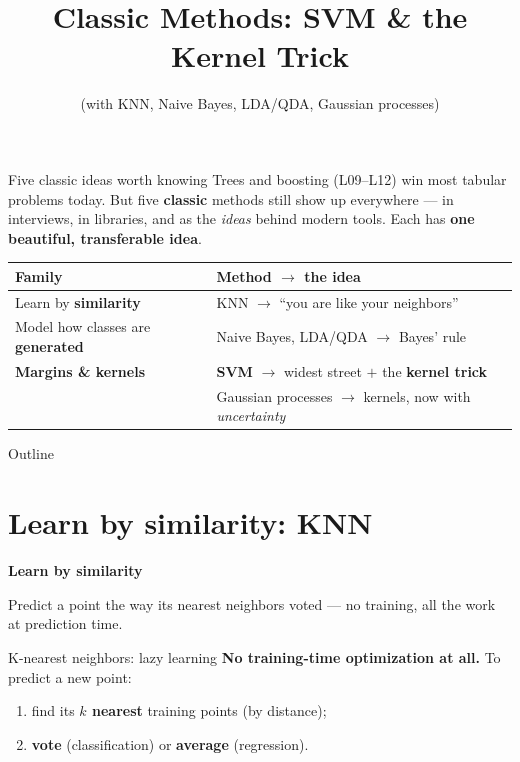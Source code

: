 \documentclass[aspectratio=169]{beamer}
\title{Classic Methods: SVM \& the Kernel Trick}
\subtitle{(with KNN, Naive Bayes, LDA/QDA, Gaussian processes)}
\date{}
\newcommand{\sectiontransition}[2]{%
  \begin{frame}[plain]
    \vfill
    \begin{center}
      {\Large\color{popblue}\textbf{#1}}\\[0.9em]
      \begin{minipage}{0.82\textwidth}\centering\small #2 \end{minipage}
    \end{center}
    \vfill
  \end{frame}}
\begin{document}
\begin{frame}{Five classic ideas worth knowing}
  Trees and boosting (L09--L12) win most tabular problems today. But five \textbf{classic}
  methods still show up everywhere --- in interviews, in libraries, and as the \emph{ideas}
  behind modern tools. Each has \textbf{one beautiful, transferable idea}.
  \vfill
  \begin{center}\small
    \renewcommand{\arraystretch}{1.25}
    \begin{tabular}{l l}
      \textbf{Family} & \textbf{Method $\to$ the idea} \\
      \hline
      Learn by \textbf{similarity} & KNN $\to$ ``you are like your neighbors'' \\
      Model how classes are \textbf{generated} & Naive Bayes, LDA/QDA $\to$ Bayes' rule \\
      \textbf{Margins \& kernels} & \textbf{SVM} $\to$ widest street $+$ the \textbf{kernel trick} \\
      & Gaussian processes $\to$ kernels, now with \emph{uncertainty} \\
      \hline
    \end{tabular}
  \end{center}
  \vfill
\end{frame}

\begin{frame}{Outline}
  \tableofcontents
\end{frame}

\section{Learn by similarity: KNN}
\sectiontransition{Learn by similarity}{Predict a point the way its nearest neighbors voted ---
no training, all the work at prediction time.}

\begin{frame}{K-nearest neighbors: lazy learning}
  \textbf{No training-time optimization at all.} To predict a new point:
  \begin{enumerate}\small
    \item find its \textbf{$k$ nearest} training points (by distance);
    \item \textbf{vote} (classification) or \textbf{average} (regression).
  \end{enumerate}
  \vfill
\end{frame}
\end{document}
